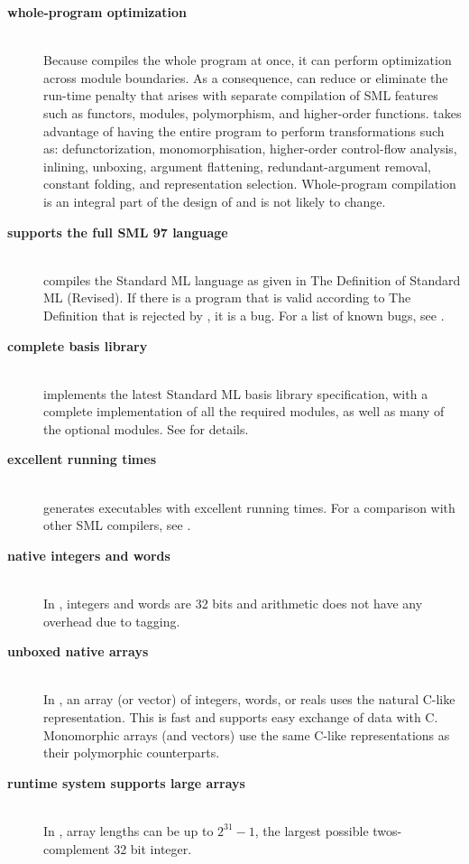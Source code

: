 %
\newcommand{\feature}[1]{\item[\bf #1]\hspace{1in}\\}
%
\begin{description}
\feature{whole-program optimization}
Because {\mlton} compiles the whole program at once, it can perform optimization
across module boundaries.  As a consequence, {\mlton} can reduce or eliminate
the run-time penalty that arises with separate compilation of SML features such
as functors, modules, polymorphism, and higher-order functions.  {\mlton} takes
advantage of having the entire program to perform transformations such as:
defunctorization, monomorphisation, higher-order control-flow analysis,
inlining, unboxing, argument flattening, redundant-argument removal, constant
folding, and representation selection.  Whole-program compilation is an integral
part of the design of {\mlton} and is not likely to change.

\feature{supports the full SML 97 language}
{\mlton} compiles the Standard ML language as given in The Definition
of Standard ML (Revised)\cite{MTHM97}.  If there is a program that is
valid according to The Definition that is rejected by {\mlton}, it is
a bug.  For a list of known bugs, see .

\feature{complete basis library}
{\mlton} implements the latest Standard ML basis library
specification, with a complete implementation of all the required
modules, as well as many of the optional modules.  See
 for details.

\feature{excellent running times}
{\mlton} generates executables with excellent running times.
For a comparison with other SML compilers, see
.

\feature{native integers and words}
In {\mlton}, integers and words are 32 bits and arithmetic does not have
any overhead due to tagging.

\feature{unboxed native arrays}
In {\mlton}, an array (or vector) of integers, words, or reals uses
the natural C-like representation.  This is fast and supports easy
exchange of data with C.  Monomorphic arrays (and vectors) use the
same C-like representations as their polymorphic counterparts.

\feature{runtime system supports large arrays}
In {\mlton}, array lengths can be up to $2^{31} - 1$, the largest possible
twos-complement 32 bit integer.


\end{description}
